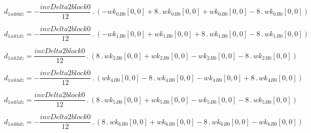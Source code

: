 \documentclass{article}
\begin{document}
\begin{dmath}d_{1 wk0 dz} = - \frac{invDelta2block0}{12} \,.\, \left(- {wk_{0}{_{B0}}}[{0,0}] + 8 \,.\, {wk_{0}{_{B0}}}[{0,0}] + {wk_{0}{_{B0}}}[{0,0}] - 8 \,.\, {wk_{0}{_{B0}}}[{0,0}]\right)\end{dmath}

\begin{dmath}d_{1 wk1 dz} = - \frac{invDelta2block0}{12} \,.\, \left(- {wk_{1}{_{B0}}}[{0,0}] + {wk_{1}{_{B0}}}[{0,0}] + 8 \,.\, {wk_{1}{_{B0}}}[{0,0}] - 8 \,.\, {wk_{1}{_{B0}}}[{0,0}]\right)\end{dmath}

\begin{dmath}d_{1 wk2 dz} = \frac{invDelta2block0}{12} \,.\, \left(8 \,.\, {wk_{2}{_{B0}}}[{0,0}] + {wk_{2}{_{B0}}}[{0,0}] - {wk_{2}{_{B0}}}[{0,0}] - 8 \,.\, {wk_{2}{_{B0}}}[{0,0}]\right)\end{dmath}

\begin{dmath}d_{1 wk4 dz} = - \frac{invDelta2block0}{12} \,.\, \left({wk_{4}{_{B0}}}[{0,0}] - 8 \,.\, {wk_{4}{_{B0}}}[{0,0}] - {wk_{4}{_{B0}}}[{0,0}] + 8 \,.\, {wk_{4}{_{B0}}}[{0,0}]\right)\end{dmath}

\begin{dmath}d_{1 wk5 dz} = \frac{invDelta2block0}{12} \,.\, \left(8 \,.\, {wk_{5}{_{B0}}}[{0,0}] + {wk_{5}{_{B0}}}[{0,0}] - {wk_{5}{_{B0}}}[{0,0}] - 8 \,.\, {wk_{5}{_{B0}}}[{0,0}]\right)\end{dmath}

\begin{dmath}d_{1 wk6 dz} = - \frac{invDelta2block0}{12} \,.\, \left(8 \,.\, {wk_{6}{_{B0}}}[{0,0}] + {wk_{6}{_{B0}}}[{0,0}] - 8 \,.\, {wk_{6}{_{B0}}}[{0,0}] - {wk_{6}{_{B0}}}[{0,0}]\right)\end{dmath}
\end{document}
